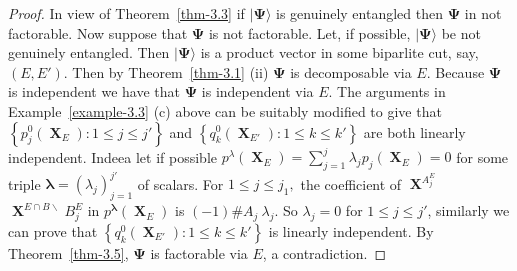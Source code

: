 \documentclass[a4paper,12pt]{article}
\DeclareMathOperator{\x}{\mathrm{X}}
\theoremstyle{definition}
\theoremstyle{underlinethm}
\theoremstyle{definition}
\begin{document}
\begin{proof}
In view of Theorem~\ref{thm-3.3} if $| \boldsymbol{\Psi} \rangle$ is genuinely entangled then $\boldsymbol{\Psi}$ in not factorable. Now suppose that $\boldsymbol{\Psi}$ is not factorable. Let, if possible, $| \boldsymbol{\Psi} \rangle$ be not genuinely entangled. Then $| \boldsymbol{\Psi} \rangle$ is a 
product vector in some biparlite cut, say, $(E, E')$. Then by Theorem~\ref{thm-3.1} (ii) $\boldsymbol{\Psi}$ is decomposable via $E$. Because $\boldsymbol{\Psi}$ is independent we have that $\boldsymbol{\Psi}$ is independent via $E$. The arguments in Example~\ref{example-3.3} (c) above can be suitably modified to give that $\left\{p_{j}^{0}(\boldsymbol{\x}_{E}) : 1 \leq j \leq j' \right\}$ and $\left\{q_{k}^{0} (\boldsymbol{\x}_{E'})  : 1 \leq k \leq k'\right\}$ are both linearly independent. Indeea let if possible $p^{\lambda}(\boldsymbol{\x}_{E}) = \sum\limits_{j=1}^{j} \lambda_{j} p_{j}(\boldsymbol{\x}_{E}) = 0$ for some triple $\boldsymbol{\lambda} = (\lambda_{j})^{j'}_{j=1}$ of scalars. For $1 \leq j \leq j_{1}, $ the coefficient of $\boldsymbol{\x}^{A_{j}^{E}}$ $\boldsymbol{\x}^{E \cap B \smallsetminus} B_{j}^{E}$ in $p^{\boldsymbol{\lambda}} (\boldsymbol{\x}_{E})$ is $(-1) \# A_{j}~ \lambda_{j}$. So $\lambda_{j} = 0$ for $1 \leq j \leq j'$, similarly we can prove that $\left\{q_{k}^{0}(\boldsymbol{\x}_{E'}) : 1 \leq k \leq k' \right\}$ is linearly independent. By Theorem~\ref{thm-3.5}, $\boldsymbol{\Psi}$ is factorable via $E$, a contradiction.
  

\end{proof}


 
\end{document}

